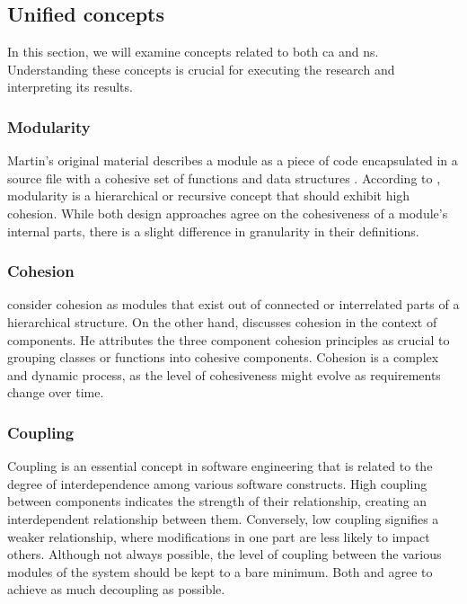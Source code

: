 \subsection{Unified concepts}
In this section, we will examine concepts related to both \gls{ca} and \gls{ns}.
Understanding these concepts is crucial for executing the research and interpreting its
results.


\subsubsection{Modularity}
Martin's original material describes a module as a piece of code encapsulated in
a source file with a cohesive set of functions and data structures
\parencite[82]{r_c_martin_clean_2018}. According to
\textcite[22]{mannaert_normalized_2016}, modularity is a hierarchical or recursive concept
that should exhibit high cohesion. While both design approaches agree on the cohesiveness
of a module's internal parts, there is a slight difference in granularity in their
definitions.

\subsubsection{Cohesion}
\textcite[22]{mannaert_normalized_2016} consider cohesion as modules that exist out of
connected or interrelated parts of a hierarchical structure. On the other hand,
\textcite[118]{r_c_martin_clean_2018} discusses cohesion in the context of
components. He attributes the three component cohesion principles as crucial to grouping
classes or functions into cohesive components. Cohesion is a complex and dynamic process,
as the level of cohesiveness might evolve as requirements change over time. 

\subsubsection{Coupling}
Coupling is an essential concept in software engineering that is related to the degree of
interdependence among various software constructs. High coupling between components
indicates the strength of their relationship, creating an interdependent relationship
between them. Conversely, low coupling signifies a weaker relationship, where
modifications in one part are less likely to impact others. Although not always possible,
the level of coupling between the various modules of the system should be kept to a bare
minimum. Both \textcite[23]{mannaert_normalized_2016} and
\textcite[130]{r_c_martin_clean_2018} agree to achieve as much decoupling as possible.